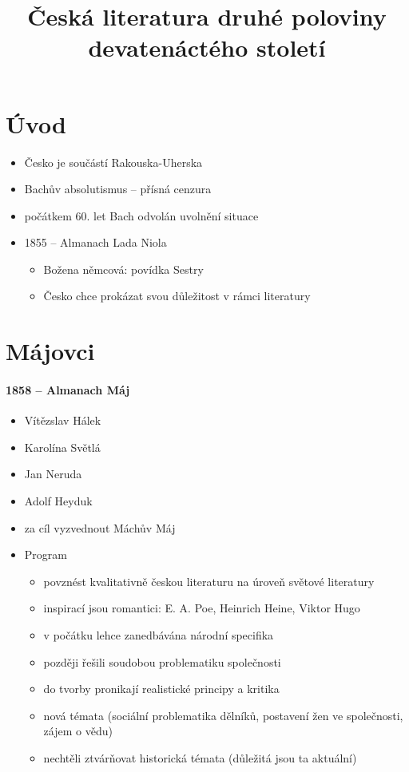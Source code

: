 \title{Česká literatura druhé poloviny devatenáctého století}


\section{Úvod}
\begin{itemize}
\item Česko je součástí Rakouska-Uherska
\item Bachův absolutismus -- přísná cenzura
\item počátkem 60. let Bach odvolán \ra uvolnění situace
\item 1855 -- Almanach Lada Niola
\begin{itemize}
\item Božena němcová: povídka Sestry
\item Česko chce prokázat svou důležitost v rámci literatury
\end{itemize}

\end{itemize}




\section{Májovci}
\paragraph{1858 -- Almanach Máj}
\begin{itemize}
\item Vítězslav Hálek
\item Karolína Světlá
\item Jan Neruda
\item Adolf Heyduk
\item za cíl vyzvednout Máchův Máj
\item Program
	\begin{itemize}
	\item povznést kvalitativně českou literaturu na úroveň světové literatury
	\item inspirací jsou romantici: E. A. Poe, Heinrich Heine, Viktor Hugo
	\item v počátku lehce zanedbávána národní specifika
	\item později řešili soudobou problematiku společnosti
	\item do tvorby pronikají realistické principy a kritika
	\item nová témata (sociální problematika dělníků, postavení žen ve společnosti, zájem o vědu)
	\item nechtěli ztvárňovat historická témata (důležitá jsou ta aktuální)
	\end{itemize}
\end{itemize}

